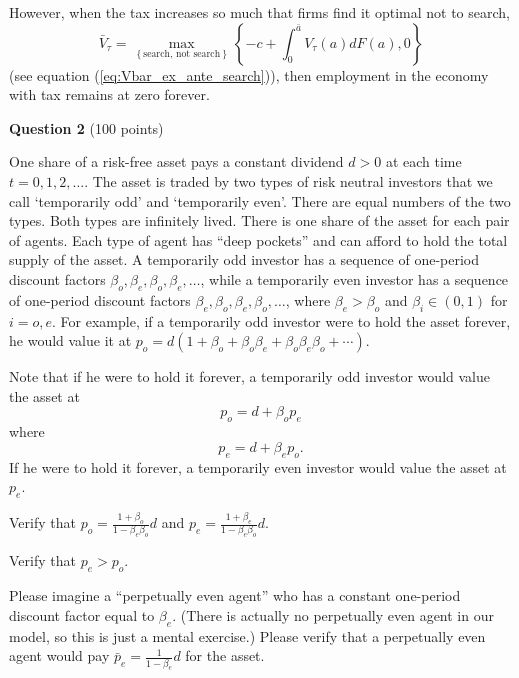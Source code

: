 \documentclass[11pt]{article}
\newenvironment{question}[1][Question]{}{}
\newenvironment{answer}[1][Answer]{}{}
\begin{document}
\begin{question}
\begin{answer}
However, when the tax increases so much that firms find it optimal not to
search,%
\begin{equation*}
\bar{V}_{\tau }=\max_{\left\{ \text{search, not search}\right\} }\left\{
-c+\int_{0}^{\bar{a}}V_{\tau }\left( a\right) dF\left( a\right) ,0\right\}
\end{equation*}
(see equation (\ref{eq:Vbar_ex_ante_search})), then employment in the
economy with tax remains at zero forever.
\end{answer}
\end{question}



\newpage


\noindent \textbf{Question 2} (100 points)\medskip

\noindent One share of a risk-free asset pays a constant dividend $d >0$ at each time $t = 0, 1, 2, \ldots$.
The asset is traded by two types of risk neutral investors that we call  `temporarily odd' and `temporarily even'. There are equal numbers of the two types.
Both types are infinitely lived.  There is one share of the asset for each pair of agents.  Each type of agent has ``deep pockets'' and can afford to hold the total supply of the asset.
A temporarily odd investor
has a sequence of one-period discount factors $\beta_o, \beta_e, \beta_o, \beta_e, \ldots $, while a temporarily  even investor
has a sequence of one-period discount factors   $\beta_e, \beta_o, \beta_e,  \beta_o, \ldots $, where $\beta_e > \beta_o$
and $\beta_i \in (0,1)$ for $i=o, e$. For example, if a temporarily odd investor were to hold the asset forever, he would value
it at $p_o = d( 1 + \beta_o + \beta_o \beta_e + \beta_o \beta_e \beta_o + \cdots )$.

\medskip
{}

\medskip
\noindent   Note that if he were to hold it forever, a temporarily odd investor would value the asset at
$$ p_o = d + \beta_o p_e$$
where
$$ p_e = d + \beta_e p_o .$$
If he were to hold it forever, a temporarily even investor would value the asset at
$p_e$.

\medskip
{} Verify that $p_o = {\frac{1 + \beta_o}{1-\beta_e \beta_o}} d $ and
$ p_e = {\frac{1 + \beta_e}{1-\beta_e \beta_o}} d $.

\medskip
{} Verify that $p_e > p_o$.


\medskip
{} Please imagine a  ``perpetually even agent'' who has a constant one-period discount factor equal to
$\beta_e$.  (There is actually no perpetually even agent in our model, so this is just a mental exercise.)  Please verify
that a perpetually even agent would pay $\bar p_e = {\frac{1}{1-\beta_e}}d $ for the asset.
\end{document}
